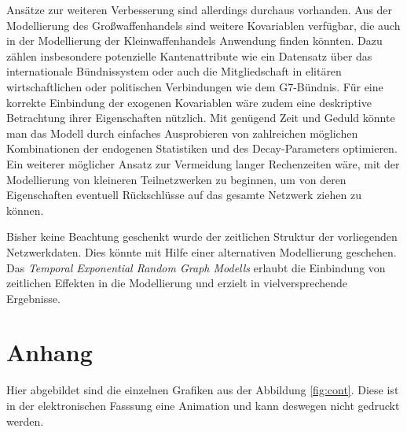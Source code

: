 \documentclass[a4paper,ngerman,oneside,titlepage,bibliography=totoc,11pt]{scrreprt}
\begin{document}
Ansätze zur weiteren Verbesserung sind allerdings durchaus vorhanden. Aus der Modellierung des Großwaffenhandels sind weitere Kovariablen verfügbar, die auch in der Modellierung der Kleinwaffenhandels Anwendung finden könnten. Dazu zählen insbesondere potenzielle Kantenattribute wie ein Datensatz über das internationale Bündnissystem oder auch die Mitgliedschaft in elitären wirtschaftlichen oder politischen Verbindungen wie dem G7-Bündnis.
Für eine korrekte Einbindung der exogenen Kovariablen wäre zudem eine deskriptive Betrachtung ihrer Eigenschaften nützlich.
Mit genügend Zeit und Geduld könnte man das Modell durch einfaches Ausprobieren von zahlreichen möglichen Kombinationen der endogenen Statistiken und des Decay-Parameters optimieren. Ein weiterer möglicher Ansatz zur Vermeidung langer Rechenzeiten wäre, mit der Modellierung von kleineren Teilnetzwerken zu beginnen, um von deren Eigenschaften eventuell Rückschlüsse auf das gesamte Netzwerk ziehen zu können.

Bisher keine Beachtung geschenkt wurde der zeitlichen Struktur der vorliegenden Netzwerkdaten. Dies könnte mit Hilfe einer alternativen Modellierung geschehen. Das \emph{Temporal Exponential Random Graph Modells} erlaubt die Einbindung von zeitlichen Effekten in die Modellierung und erzielt in \citet{armstransfer} vielversprechende Ergebnisse. 



\newpage









\listoffigures
\newpage
\listoftables
\newpage



\chapter*{Anhang}

Hier abgebildet sind die einzelnen Grafiken aus der Abbildung \ref{fig:cont}. Diese ist in der elektronischen Fasssung eine Animation und kann deswegen nicht gedruckt werden.
\end{document}
